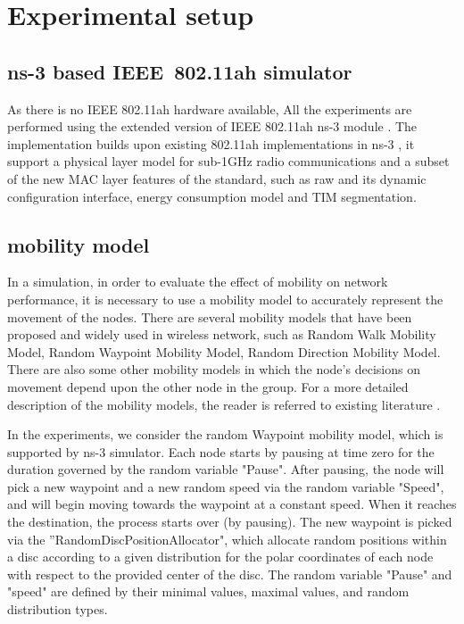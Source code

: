 \section{Experimental setup \label{sec:factors_selection}}

\subsection{ns-3 based IEEE~802.11ah simulator}

As there is no IEEE 802.11ah hardware available, All the experiments are performed using the extended version of IEEE 802.11ah ns-3 module \cite{WNS32018}. The implementation builds upon existing 802.11ah implementations in ns-3 \cite{wns32016}, it support a physical layer model for sub-1GHz radio communications and a subset of the new MAC layer features of the standard, such as \gls{raw} and its dynamic configuration interface, energy consumption model and TIM segmentation.

\subsection{mobility model}

In a simulation, in order to evaluate the effect of mobility on network performance, it is necessary to use a mobility model to accurately represent the movement of the nodes.
There are several mobility models that have been proposed and widely used in wireless network, such as 
Random Walk Mobility Model, Random Waypoint Mobility Model, Random Direction Mobility Model. There are also some other mobility models in which the node's decisions on movement depend upon the other node in the group. For a more detailed description of the mobility models, the reader is referred to existing literature \cite{camp2002survey}.


In the experiments, we consider the random Waypoint mobility model, which is supported by ns-3 simulator. Each node starts by pausing at time zero for the duration governed by the random variable "Pause". After pausing, the node will pick a new waypoint and a new random speed via the random variable "Speed", and will begin moving towards the waypoint at a constant speed. When it reaches the destination, the process starts over (by pausing). The new waypoint is picked via the ''RandomDiscPositionAllocator", which allocate random positions within a disc according to a given distribution for the polar coordinates of each node with respect to the provided center of the disc. The random variable "Pause" and "speed" are defined by their minimal values, maximal values, and random distribution types.



